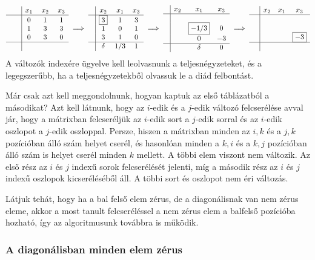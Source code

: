 \documentclass[9pt, a4paper, showtrims]{memoir}
\theoremstyle{plain}
\theoremstyle{remark}
\theoremstyle{definition}
\begin{document}
\[
\begin{array}{c|ccc}
     & x_1       & x_2 & x_3 \\
     \hline
     \phantom{\boxed{3}} & 0 & 1   & 1   \\
     & 1 & 3   & 3   \\
     & 0 & 3   & 0   \\
    \hline
    & \phantom{\delta}     &\phantom{1/3}    &\phantom{1}
\end{array}
\implies
\begin{array}{c|ccc}
     & x_2       & x_1 & x_3 \\
     \hline
     & \boxed{3} & 1   & 3   \\
     & 1         & 0   & 1   \\
     & 3         & 1   & 0   \\
    \hline
    & \delta     & 1/3   & 1 
\end{array}
\implies
\begin{array}{c|ccc}
     & x_2& x_1  & x_3 \\
     \hline
     & &                &     \\
     & & \boxed{-1/3}      & 0   \\
     & & 0              & -3   \\
     \hline
     & & \delta         & 0
\end{array}
\implies
\begin{array}{c|ccc}
     & x_2 & x_1 & x_3      \\
     \hline
     &     &     &          \\
     &     &     &          \\
     &     &     & \boxed{-3}\\
    \hline
    \phantom{\delta}
\end{array}
\]
A változók indexére ügyelve kell leolvasnunk a teljesnégyzeteket, és a legegszerűbb, ha a teljesnégyzetekből olvassuk le a diád felbontást.

Már csak azt kell meggondolnunk, hogyan kaptuk az első táblázatból a másodikat?
Azt kell látnunk, hogy az $i$-edik és a $j$-edik változó felcserélése avval jár, 
hogy a mátrixban felcseréljük az $i$-edik sort a $j$-edik sorral és az $i$-edik oszlopot a $j$-edik oszloppal.
Persze, hiszen a mátrixban minden az $i,k$ és a $j,k$ pozícióban álló szám helyet cserél, 
és hasonlóan minden a $k,i$ és a $k,j$ pozícióban álló szám is helyet cserél minden $k$ mellett.
A többi elem viszont nem változik.
Az első rész az $i$ és $j$ indexű sorok felcserélését jelenti, míg a második rész az $i$ és $j$ indexű oszlopok kicseréléséből áll.
A többi sort és oszlopot nem éri változás.

Látjuk tehát, hogy ha a bal felső elem zérus, de a diagonálisnak van nem zérus eleme, 
akkor a most tanult felcseréléssel a nem zérus elem a balfelső pozícióba hozható, így az algoritmusunk továbbra is működik.

\subsubsection{A diagonálisban minden elem zérus}
\backmatter
\pagestyle{empty}
%
\printbibliography
\printindex
\end{document}
